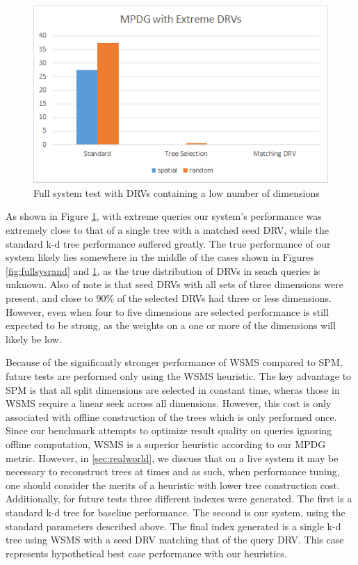 \begin{figure}[h]
\begin{center}
\includegraphics[width=.85\textwidth]{Figures/fullsysext}
\end{center}
\caption{Full system test with DRVs containing a low number of dimensions}
\label{fig:fullsysext}
\end{figure}

As shown in Figure \ref{fig:fullsysext}, with extreme queries our system's performance was extremely close to that of a single tree with a matched seed DRV, while the standard k-d tree performance suffered greatly.  The true performance of our system likely lies somewhere in the middle of the cases shown in Figures \ref{fig:fullsysrand} and \ref{fig:fullsysext}, as the true distribution of DRVs in seach queries is unknown.  Also of note is that seed DRVs with all sets of three dimensions were present, and close to 90\% of the selected DRVs had three or less dimensions.  However, even when four to five dimensions are selected performance is still expected to be strong, as the weights on a one or more of the dimensions will likely be low.

Because of the significantly stronger performance of WSMS compared to SPM, future tests are performed only using the WSMS heuristic.  The key advantage to SPM is that all split dimensions are selected in constant time, wheras those in WSMS require a linear seek across all dimensions.  However, this cost is only associated with offline construction of the trees which is only performed once.  Since our benchmark attempts to optimize result quality on queries ignoring offline computation, WSMS is a superior heuristic according to our MPDG metric.  However, in \ref{sec:realworld}, we discuss that on a live system it may be necessary to reconstruct trees at times and as such, when performance tuning, one should consider the merits of a heuristic with lower tree construction cost.  Additionally, for future tests three different indexes were generated.  The first is a standard k-d tree for baseline performance.  The second is our system, using the standard parameters described above.  The final index generated is a single k-d tree using WSMS with a seed DRV matching that of the query DRV.  This case represents hypothetical best case performance with our heuristics.

